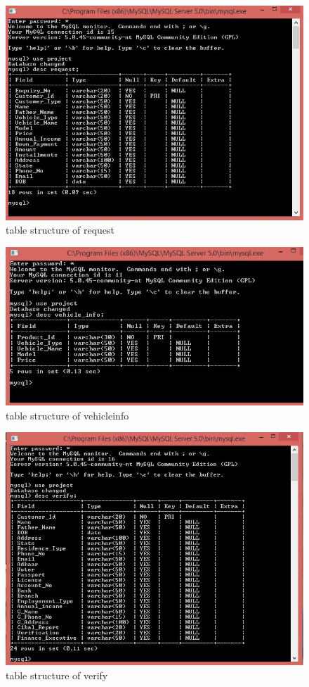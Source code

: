 \begin{figure}[ht]
\begin{center}
\includegraphics[scale=0.5]{images/t9.jpg}
\end{center}
\caption{table structure of request}
\label{table structure of request}
\end{figure}


\begin{figure}[ht]
\begin{center}
\includegraphics[scale=0.5]{images/t10.jpg}
\end{center}
\caption{table structure of vehicleinfo}
\label{table structure of vehicleinfo}
\end{figure}


\begin{figure}[ht]
\begin{center}
\includegraphics[scale=0.5]{images/t11.jpg}
\end{center}
\caption{table structure of verify}
\label{table structure of verify}
\end{figure}
